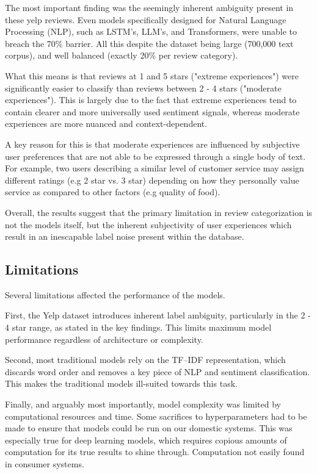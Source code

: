 \documentclass[12pt]{article}
\begin{document}
The most important finding was the seemingly inherent ambiguity present in these yelp reviews. Even models specifically designed for Natural Language Processing (NLP), such as LSTM's, LLM's, and Transformers, were unable to breach the 70\% barrier. All this despite the dataset being large (700,000 text corpus), and well balanced (exactly 20\% per review category).

What this means is that reviews at 1 and 5 stars ("extreme experiences") were significantly easier to classify than reviews between 2 - 4 stars ("moderate experiences"). This is largely due to the fact that extreme experiences tend to contain clearer and more universally used sentiment signals, whereas moderate experiences are more nuanced and context-dependent.

A key reason for this is that moderate experiences are influenced by subjective user preferences that are not able to be expressed through a single body of text. For example, two users describing a similar level of customer service may assign different ratings (e.g 2 star vs. 3 star) depending on how they personally value service as compared to other factors (e.g quality of food).

Overall, the results suggest that the primary limitation in review categorization is not the models itself, but the inherent subjectivity of user experiences which result in an inescapable label noise present within the database.

\subsection{Limitations}
Several limitations affected the performance of the models.

First, the Yelp dataset introduces inherent label ambiguity, particularly in the 2 - 4 star range, as stated in the key findings. This limits maximum model performance regardless of architecture or complexity.

Second, most traditional models rely on the TF--IDF representation, which discards word order and removes a key piece of NLP and sentiment classification. This makes the traditional models ill-suited towards this task.

Finally, and arguably most importantly, model complexity was limited by computational resources and time. Some sacrifices to hyperparameters had to be made to ensure that models could be run on our domestic systems. This was especially true for deep learning models, which requires copious amounts of computation for its true results to shine through. Computation not easily found in consumer systems.
\end{document}
